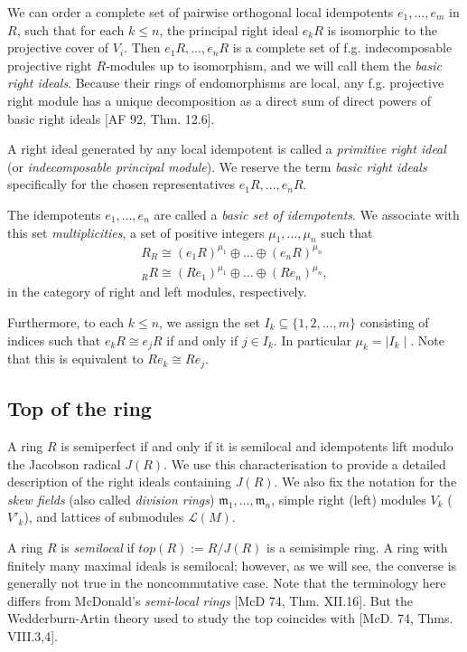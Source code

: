 \documentclass[11pt]{article}
\theoremstyle{plain}
\theoremstyle{remark}
\theoremstyle{plain}
\newcommand{\m}{\mathfrak{m}}
\begin{document}
We can order a complete set of pairwise orthogonal local idempotents $e_1,\dots, e_m$ in $R$, such that for each $k\leq n$, the principal right ideal $e_kR$ is isomorphic to the projective cover of $V_i$. Then $e_1R,\dots, e_nR$ is a complete set of f.g. indecomposable projective right $R$-modules up to isomorphism, and we will call them the \textit{basic right ideals}. Because their rings of endomorphisms are local, any f.g. projective right module has a unique decomposition as a direct sum of direct powers of basic right ideals [AF 92, Thm. 12.6].

A right ideal generated by any local idempotent is called a \textit{primitive right ideal} (or \textit{indecomposable principal module}). We reserve the term \textit{basic right ideals} specifically for the chosen representatives $e_1R,\dots, e_nR$. 

The idempotents $e_1,\dots, e_n$ are called a \textit{basic set of idempotents}. We associate with this set \textit{multiplicities}, a set of positive integers $\mu_1,\dots, \mu_n$ such that 
 \begin{gather*}
     R_R\cong (e_1R)^{\mu_1}\oplus \dots \oplus  (e_nR)^{\mu_n}  \\ 
          _R R\cong (Re_1)^{\mu_1}\oplus \dots \oplus  (Re_n)^{\mu_n},
 \end{gather*}
in the category of right and left modules, respectively.

Furthermore, to each $k\leq n$, we assign the set $I_k\subseteq \{1, 2, \dots, m\}$ consisting of indices such that $e_kR\cong e_jR$ if and only if $j\in I_k$. In particular $\mu_k=\mid I_k\mid$. Note that this is equivalent to $Re_k\cong Re_j$.




\subsection{Top of the ring}\label{Secsemptop}



A ring $R$ is semiperfect if and only if it is semilocal and idempotents lift modulo the Jacobson radical $J(R)$.  We use this characterisation to provide a detailed description of the right ideals containing $J(R)$. We also fix the notation for the \textit{skew fields} (also called \textit{division rings}) $\m_1, \dots, \m_n$,  simple right (left) modules $V_k$ ($V'_k$), and lattices of submodules $\mathcal{L}(M)$.


A ring $R$ is \textit{semilocal} if $top(R):=R/J(R)$ is a semisimple ring.  A ring with finitely many maximal ideals is semilocal; however, as we will see, the converse is generally not true in the noncommutative case. Note that the terminology here differs from McDonald's \textit{semi-local rings} [McD 74, Thm. XII.16]. But the Wedderburn-Artin theory used to study the top coincides with [McD. 74, Thms. VIII.3,4].
\end{document}
